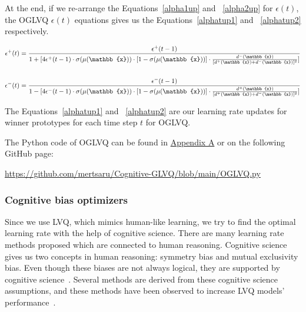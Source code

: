 At the end, if we re-arrange the Equations~\eqref{alpha1up} and ~\eqref{alpha2up} for $\epsilon(t)$, the OGLVQ $\epsilon(t)$ equations gives us the Equations~\eqref{alphatup1} and ~\eqref{alphatup2} respectively.
\vspace{10pt}

\begin{subequations}
\label{alphatup}
\renewcommand{\theequation}{\theparentequation.\arabic{equation}}
    \begin{align}
\epsilon^{+}(t) &= \frac{\epsilon^{+}(t-1)}{1+[4\epsilon^{+}(t-1)\cdot \sigma(\mu(\mathbb{x}))\cdot [1-\sigma(\mu(\mathbb{x}))]\cdot \frac{d^{-}(\mathbb{x})}{[d^{+}(\mathbb{x}) + d^{-}(\mathbb{x})]^{2}}]}\label{alphatup1}\\
\notag\\
\epsilon^{-}(t) &= \frac{\epsilon^{-}(t-1)}{1-[4\epsilon^{-}(t-1)\cdot \sigma(\mu(\mathbb{x}))\cdot [1-\sigma(\mu(\mathbb{x}))]\cdot \frac{d^{+}(\mathbb{x})}{[d^{+}(\mathbb{x}) + d^{-}(\mathbb{x})]^{2}}]}\label{alphatup2}
    \end{align}
    \end{subequations}
\vspace{10pt}

The Equations~\eqref{alphatup1} and ~\eqref{alphatup2} are our learning rate updates for winner prototypes for each time step $t$ for OGLVQ.
\vspace{10pt}

\noindent The Python code of OGLVQ can be found in \hyperlink{appoglvq}{Appendix A} or on the following GitHub page:

\noindent \url{https://github.com/mertsaru/Cognitive-GLVQ/blob/main/OGLVQ.py}





\subsubsection{Cognitive bias optimizers}

Since we use LVQ, which mimics human-like learning, we try to find the optimal learning rate with the help of cognitive science. There are many learning rate methods proposed which are connected to human reasoning. Cognitive science gives us two concepts in human reasoning: symmetry bias and mutual exclusivity bias. Even though these biases are not always logical, they are supported by cognitive science~\cite{tversky}. Several methods are derived from these cognitive science assumptions, and these methods have been observed to increase LVQ models’ performance~\cite{cogn,lrimp}.

